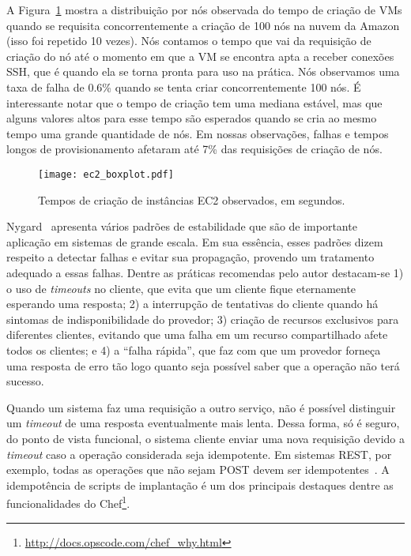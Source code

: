 \begin{description}
A Figura~\ref{fig:ec2_boxplot} mostra a distribuição por nós observada
do tempo de criação de VMs quando se requisita concorrentemente a criação
de 100 nós na nuvem da Amazon (isso foi repetido 10 vezes).
Nós contamos o tempo que vai da requisição de criação do nó
até o momento em que a VM se encontra apta a receber conexões SSH,
que é quando ela se torna pronta para uso na prática.
Nós observamos uma taxa de falha de 0.6\%
quando se tenta criar concorrentemente 100 nós.
É interessante notar que o tempo de criação tem uma mediana estável,
mas que alguns valores altos para esse tempo são esperados quando
se cria ao mesmo tempo uma grande quantidade de nós.
Em nossas observações, falhas e tempos longos de provisionamento
afetaram até 7\% das requisições de criação de nós.

\begin{figure}[ht]
\centering
\texttt{[image: ec2\_boxplot.pdf]}
\caption{Tempos de criação de instâncias EC2 observados, em segundos.}
\label{fig:ec2_boxplot}
\end{figure}

Nygard~\cite{Nygard2009Release} apresenta vários padrões de estabilidade que são de importante aplicação em sistemas de grande escala. Em sua essência, esses padrões dizem respeito a detectar falhas e evitar sua propagação, provendo um tratamento adequado a essas falhas. Dentre as práticas recomendas pelo autor destacam-se 1) o uso de \emph{timeouts} no cliente, que evita que um cliente fique eternamente esperando uma resposta; 2) a interrupção de tentativas do cliente quando há sintomas de indisponibilidade do provedor; 3) criação de recursos exclusivos para diferentes clientes, evitando que uma falha em um recurso compartilhado afete todos os clientes; e 4) a ``falha rápida'', que faz com que um provedor forneça uma resposta de erro tão logo quanto seja possível saber que a operação não terá sucesso.

Quando um sistema faz uma requisição a outro serviço, não é possível distinguir um \emph{timeout} de uma resposta eventualmente mais lenta. Dessa forma, só é seguro, do ponto de vista funcional, o sistema cliente enviar uma nova requisição devido a \emph{timeout} caso a operação considerada seja idempotente. Em sistemas REST, por exemplo, todas as operações que não sejam POST devem ser idempotentes~\cite{Allamaraju2010REST}. A idempotência de scripts
de implantação é um dos principais destaques dentre as funcionalidades do 
Chef\footnote{\url{http://docs.opscode.com/chef_why.html}}.


\end{description}

